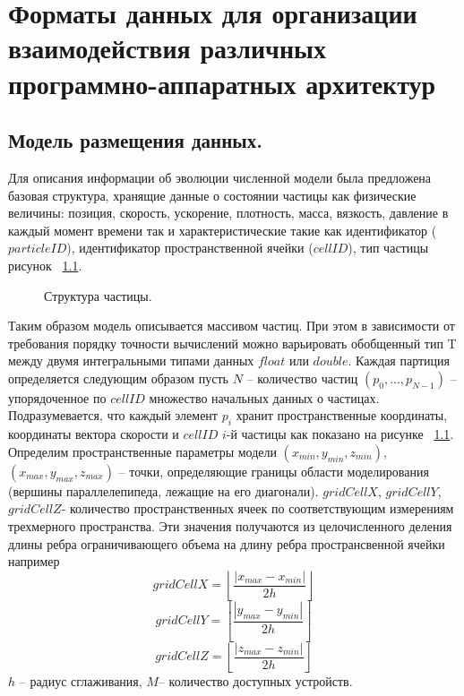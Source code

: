 \chapter{Форматы данных для организации взаимодействия различных программно-аппаратных архитектур}\label{ch:ch3}

\section{Модель размещения данных.}\label{sec:ch3/sect1}

Для описания информации об эволюции численной модели была предложена базовая структура, хранящие данные о состоянии частицы как физические величины: позиция, скорость, ускорение, плотность, масса, вязкость, давление в каждый момент времени так и характеристические такие как идентификатор (\(particleID\)), идентификатор пространственной ячейки (\(cellID\)), тип частицы рисунок ~\ref{fig:p_struct}.
\begin{figure}[ht]
  \caption{Структура частицы.}\label{fig:p_struct}
\end{figure}

Таким образом модель описывается массивом частиц. При этом в зависимости от требования порядку точности вычислений можно варьировать обобщенный тип T между двумя интегральными типами данных \(float\) или \(double\). Каждая партиция определяется следующим образом пусть \(N\) – количество частиц \((p_0,...,p_{N-1})\) – упорядоченное по \(cellID\) множество начальных данных о частицах. Подразумевается, что каждый элемент \(p_i\) хранит пространственные координаты, координаты вектора скорости и \(cellID\) \(i\)-й частицы как показано на рисунке ~\ref{fig:p_struct}. Определим пространственные параметры модели
\((x_{min}, y_{min}, z_{min})\), \((x_{max}, y_{max}, z_{max})\) – точки, определяющие границы области моделирования (вершины параллелепипеда, лежащие на его диагонали).
\(gridCellX\), \(gridCellY\), \(gridCellZ\)- количество пространственных ячеек по соответствующим измерениям трехмерного пространства. Эти значения получаются из целочисленного деления длины ребра ограничивающего объема на длину ребра пространсвенной ячейки например
\[
  gridCellX = \left \lfloor \frac{\left |x_{max} - x_{min}  \right |}{2h} \right \rfloor
\]
\[
  gridCellY = \left \lfloor \frac{\left |y_{max} - y_{min}  \right |}{2h} \right \rfloor
\]
\[
  gridCellZ = \left \lfloor \frac{\left |z_{max} - z_{min}  \right |}{2h} \right \rfloor
\]
\(h\) – радиус сглаживания,
\(M\)– количество доступных устройств.

